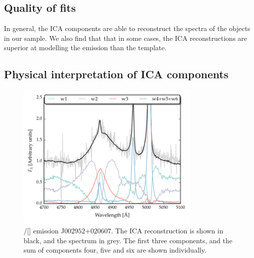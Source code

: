 \subsection{Quality of fits}

In general, the ICA components are able to reconstruct the spectra of the objects in our sample. 
We also find that that in some cases, the ICA reconstructions are superior at modelling the  emission than the \citet{boroson92} template. 

\subsection{Physical interpretation of ICA components}

\begin{figure}[t!]
    \centering
    \includegraphics[width=0.8\textwidth]{figures/chapter04/mfica_components.pdf} 
    \caption{\hbns/[] emission J$002952$+$020607$. The ICA reconstruction is shown in black, and the spectrum in grey. The first three components, and the sum of components four, five and six are shown individually.}     
    \label{fig:mfica_components}
\end{figure}


